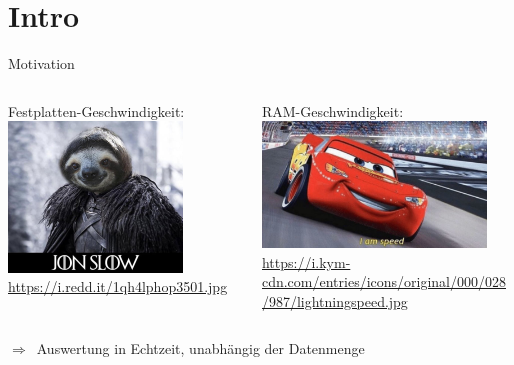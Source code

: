 \section{Intro}
\begin{frame}{Motivation}
	\begin{columns}[T]
		\begin{column}{0.45\textwidth}
			Festplatten-Geschwindigkeit:
			\includegraphics[width=0.75\textwidth]{pics/slow.jpg}\\
			\tiny\url{https://i.redd.it/1qh4lphop3501.jpg}
		\end{column}
		\begin{column}{0.45\textwidth}
			RAM-Geschwindigkeit:
			\includegraphics[width=0.9\textwidth]{pics/speed.jpg}\\
			\tiny\url{https://i.kym-cdn.com/entries/icons/original/000/028/987/lightningspeed.jpg}
		\end{column}%
	\end{columns}
	\pause
	\vspace{1em}
	$\Rightarrow$~Auswertung in Echtzeit, unabhängig der Datenmenge
\end{frame}

